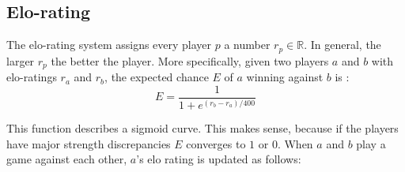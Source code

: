 \documentclass[12pt]{article}
\begin{document}
\subsection{Elo-rating} \label{sec:Evaluation:elo-rating}
The elo-rating system assigns every player \(p\) a number \(r_p \in \mathbb{R}\). In general, the larger \(r_p\) the better the player. More specifically, given two players \(a\) and \(b\) with elo-ratings \(r_a\) and \(r_b\), the expected chance \(E\) of \(a\) winning against \(b\) is \cite{silver2018general}:
\begin{equation} \label{eq:elo_pred}
E = \frac{1}{1 + e^{(r_b-r_a)/400}}
\end{equation}
\begin{center}

\end{center}
This function describes a sigmoid curve. This makes sense, because if the players have major strength discrepancies \(E\) converges to \(1\) or \(0\). When \(a\) and \(b\) play a game against each other, \(a\)'s elo rating is updated as follows\cite{elo1978rating}:
\end{document}
